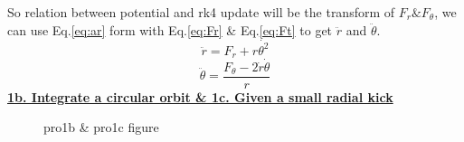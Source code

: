 \documentclass{article}
\begin{document}
So relation between potential and rk4 update will be the transform of  $F_r\&F_{\theta}$, we can use Eq.\ref{eq:ar} form with Eq.\ref{eq:Fr} \& Eq.\ref{eq:Ft} to get $\ddot{r}$ and $\ddot{\theta}$.
$$\ddot{r}=F_r+r\dot{\theta^2}$$
$$\ddot{\theta}=\frac{F_{\theta}-2\dot{r}\dot{\theta}}{r}$$
\underline{\textbf{1b. Integrate a circular orbit \& 1c. Given a small radial kick}}
\begin{figure}[h]
    \centering
    \caption{pro1b \& pro1c figure}
    \label{fig:pro1bc}
\end{figure}
\end{document}
